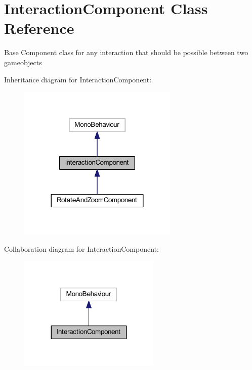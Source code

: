 \hypertarget{class_interaction_component}{}\section{Interaction\+Component Class Reference}
\label{class_interaction_component}


Base Component class for any interaction that should be possible between two gameobjects  




Inheritance diagram for Interaction\+Component\+:
\nopagebreak
\begin{figure}[H]
\begin{center}
\leavevmode
\includegraphics[width=216pt]{class_interaction_component__inherit__graph}
\end{center}
\end{figure}


Collaboration diagram for Interaction\+Component\+:
\nopagebreak
\begin{figure}[H]
\begin{center}
\leavevmode
\includegraphics[width=191pt]{class_interaction_component__coll__graph}
\end{center}
\end{figure}
